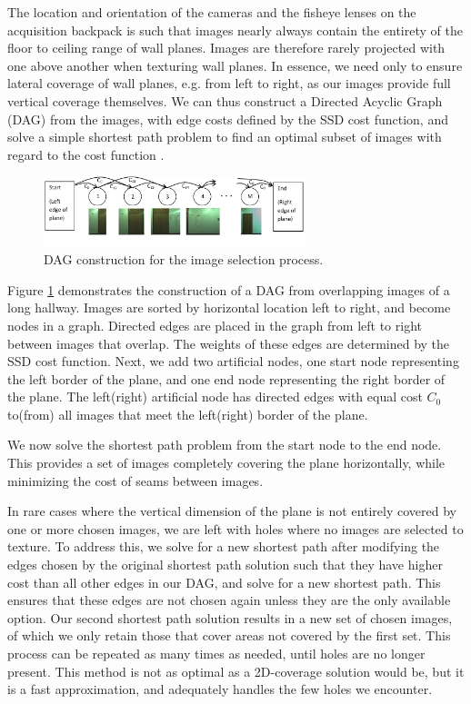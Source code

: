 \documentclass[10pt,twocolumn,letterpaper]{article}
\begin{document}
The location and orientation of the cameras and the fisheye lenses on
the acquisition backpack is such that images nearly always contain the
entirety of the floor to ceiling range of wall planes. Images are
therefore rarely projected with one above another when texturing wall
planes. In essence, we need only to ensure lateral coverage of wall
planes, e.g. from left to right, as our images provide full vertical
coverage themselves. We can thus construct a Directed Acyclic Graph
(DAG) from the images, with edge costs defined by the SSD cost
function, and solve a simple shortest path problem to find an optimal
subset of images with regard to the cost function \cite{dijkstra}.

\begin{figure}
  \centering
  \includegraphics[width=3in]{dagCreation.pdf}
  \caption{DAG construction for the image selection process.}
  \label{fig:dagCreation}
\end{figure}

Figure \ref{fig:dagCreation} demonstrates the construction of a DAG
from overlapping images of a long hallway. Images are sorted by
horizontal location left to right, and become nodes in a
graph. Directed edges are placed in the graph from left to right
between images that overlap. The weights of these edges are determined
by the SSD cost function. Next, we add two artificial nodes, one start
node representing the left border of the plane, and one end node
representing the right border of the plane. The left(right) artificial
node has directed edges with equal cost $C_0$ to(from) all images that
meet the left(right) border of the plane.

We now solve the shortest path problem from the start node to the end
node. This provides a set of images completely covering the plane
horizontally, while minimizing the cost of seams between images.

In rare cases where the vertical dimension of the plane is not
entirely covered by one or more chosen images, we are left with holes
where no images are selected to texture. To address this, we solve for
a new shortest path after modifying the edges chosen by the original
shortest path solution such that they have higher cost than all other
edges in our DAG, and solve for a new shortest path. This ensures that
these edges are not chosen again unless they are the only available
option. Our second shortest path solution results in a new set of
chosen images, of which we only retain those that cover areas not
covered by the first set. This process can be repeated as many times
as needed, until holes are no longer present. This method is not as
optimal as a 2D-coverage solution would be, but it is a fast
approximation, and adequately handles the few holes we encounter.
\end{document}
